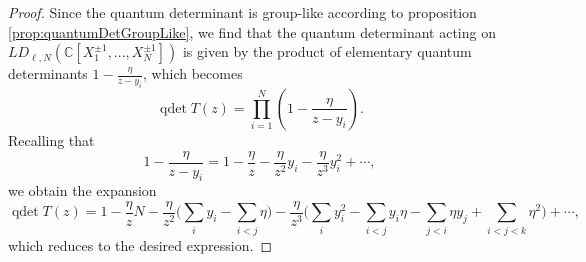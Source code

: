 \documentclass[11pt]{report}
\theoremstyle{definition}
\theoremstyle{remark}
\theoremstyle{remark}
\newcommand{\C}{\mathbb{C}}
\begin{document}
\begin{proof}
Since the quantum determinant is group-like according to proposition \ref{prop:quantumDetGroupLike}, we find that the quantum determinant acting on $LD_{\ell,N}(\C[X_1^{\pm 1},...,X_N^{\pm 1}])$ is given by the product of elementary quantum determinants $1-\frac{\eta}{z-y_i}$, which becomes
\begin{equation*}
\operatorname{qdet} T(z) = \prod_{i=1}^N \left( 1 - \frac{\eta}{z-y_i} \right).
\end{equation*}
Recalling that
\begin{equation*}
1-\frac{\eta}{z-y_i} = 1 - \frac{\eta}{z} - \frac{\eta}{z^2} y_i - \frac{\eta}{z^3} y_i^2 + \cdots,
\end{equation*}
we obtain the expansion
\begin{equation*}
\operatorname{qdet} T(z) = 1 - \frac{\eta}{z} N - \frac{\eta}{z^2} \bigg( \sum_i y_i - \sum_{i < j} \eta \bigg)
- \frac{\eta}{z^3} \bigg( \sum_i y_i^2 - \sum_{i < j} y_i \eta - \sum_{j < i} \eta y_j + \sum_{i < j < k} \eta^2 \bigg) + \cdots,
\end{equation*}
which reduces to the desired expression.
%

\end{proof}
\end{document}

